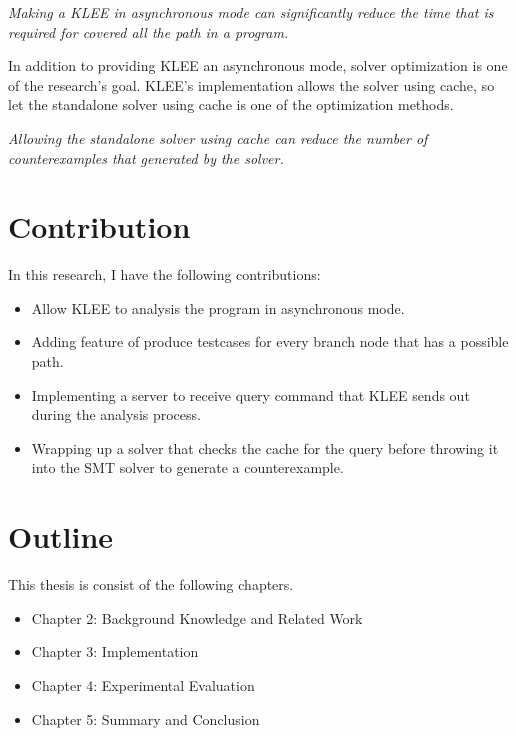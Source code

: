     \begin{hyp}
    \textit{Making a KLEE in asynchronous mode can significantly reduce the time that is required for covered all the path in a program.}
    \end{hyp}
    
In addition to providing KLEE an asynchronous mode, solver optimization is one of the research's goal. KLEE's implementation allows the solver using cache, so let the standalone solver using cache is one of the optimization methods.

    \begin{hyp}
    \textit{Allowing the standalone solver using cache can reduce the number of counterexamples that generated by the solver.}
    \end{hyp}

\section{Contribution}

In this research, I have the following contributions:
\begin{itemize}
    \item Allow KLEE to analysis the program in asynchronous mode.
    \item Adding feature of produce testcases for every branch node that has a possible path.
    \item Implementing a server to receive query command that KLEE sends out during the analysis process.
    \item Wrapping up a solver that checks the cache for the query before throwing it into the SMT solver to generate a counterexample. 
\end{itemize}
\section{Outline}
This thesis is consist of the following chapters.
\begin{itemize}
    \item Chapter 2: Background Knowledge and Related Work
    \item Chapter 3: Implementation
    \item Chapter 4: Experimental Evaluation
    \item Chapter 5: Summary and Conclusion
\end{itemize}